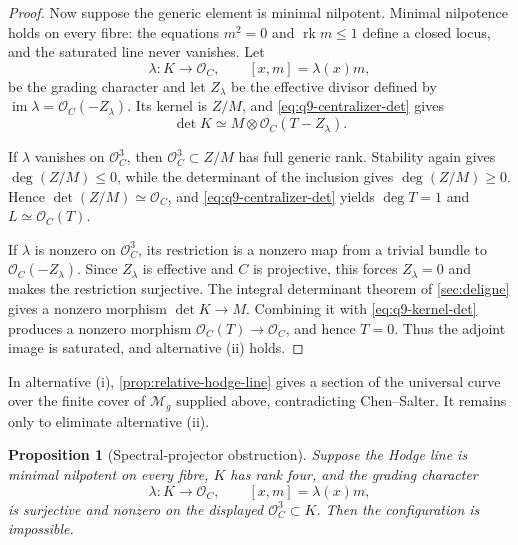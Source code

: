 \documentclass[11pt]{article}
\newtheorem{proposition}[theorem]{Proposition}
\theoremstyle{definition}
\newcommand{\Ocal}{\mathcal O}
\newcommand{\Mcal}{\mathcal M}
\newcommand{\rk}{\operatorname{rk}}
\begin{document}
\begin{proof}
Now suppose the generic element is minimal nilpotent.  Minimal nilpotence holds
on every fibre: the equations $m^2=0$ and $\rk m\le1$ define a closed locus,
and the saturated line never vanishes.  Let
\[
 \lambda:K\longrightarrow\Ocal_C,
 \qquad [x,m]=\lambda(x)m,
\]
be the grading character and let $Z_\lambda$ be the effective divisor defined
by $\operatorname{im}\lambda=\Ocal_C(-Z_\lambda)$.  Its kernel is
$Z/M$, and \eqref{eq:q9-centralizer-det} gives
\begin{equation}
 \det K\simeq M\otimes\Ocal_C(T-Z_\lambda).
 \label{eq:q9-kernel-det}
\end{equation}

If $\lambda$ vanishes on $\Ocal_C^3$, then
$\Ocal_C^3\subset Z/M$ has full generic rank.  Stability again gives
$\deg(Z/M)\le0$, while the determinant of the inclusion gives
$\deg(Z/M)\ge0$.  Hence $\det(Z/M)\simeq\Ocal_C$, and
\eqref{eq:q9-centralizer-det} yields $\deg T=1$ and
$L\simeq\Ocal_C(T)$.

If $\lambda$ is nonzero on $\Ocal_C^3$, its restriction is a nonzero map
from a trivial bundle to $\Ocal_C(-Z_\lambda)$.  Since $Z_\lambda$ is
effective and $C$ is projective, this forces $Z_\lambda=0$ and makes the
restriction surjective.  The integral determinant theorem of
\cref{sec:deligne} gives a nonzero morphism $\det K\to M$.  Combining it
with \eqref{eq:q9-kernel-det} produces a nonzero morphism
$\Ocal_C(T)\to\Ocal_C$, and hence $T=0$.  Thus the adjoint image is
saturated, and alternative (ii) holds.
\end{proof}

In alternative (i), \cref{prop:relative-hodge-line} gives a section of the
universal curve over the finite cover of $\Mcal_g$ supplied above,
contradicting Chen--Salter.  It remains only to eliminate alternative (ii).

\begin{proposition}[Spectral-projector obstruction]\label{prop:q9-spectral}
Suppose the Hodge line is minimal nilpotent on every fibre, $K$ has rank
four, and the grading character
\[
 \lambda:K\longrightarrow\Ocal_C,
 \qquad [x,m]=\lambda(x)m,
\]
is surjective and nonzero on the displayed $\Ocal_C^3\subset K$.  Then the
configuration is impossible.
\end{proposition}
\end{document}
